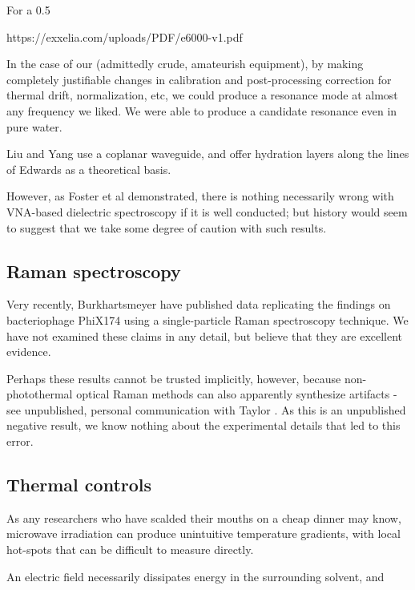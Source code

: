 \documentclass[paper.tex]{subfiles}
\begin{document}
\begin{multicols}{1}

For a 0.5%

https://exxelia.com/uploads/PDF/e6000-v1.pdf


In the case of our (admittedly crude, amateurish equipment), by making completely justifiable changes in calibration and post-processing correction for thermal drift, normalization, etc, we could produce a resonance mode at almost any frequency we liked. We were able to produce a candidate resonance even in pure water.


Liu and Yang use a coplanar waveguide, and offer hydration layers along the lines of Edwards as a theoretical basis.




However, as Foster et al demonstrated, there is nothing necessarily wrong with VNA-based dielectric spectroscopy if it is well conducted; but history would seem to suggest that we take some degree of caution with such results.


\subsection{Raman spectroscopy}

Very recently, Burkhartsmeyer \cite{Optical2020} have published data replicating the findings on bacteriophage PhiX174 using a single-particle Raman spectroscopy technique. We have not examined these claims in any detail, but believe that they are excellent evidence.

Perhaps these results cannot be trusted implicitly, however, because non-photothermal optical Raman methods can also apparently synthesize artifacts - see unpublished, personal communication with Taylor \cite{mechanisms1981}. As this is an unpublished negative result, we know nothing about the experimental details that led to this error.

\subsection{Thermal controls}

As any researchers who have scalded their mouths on a cheap dinner may know, microwave irradiation can produce unintuitive temperature gradients, with local hot-spots that can be difficult to measure directly.

An electric field necessarily dissipates energy in the surrounding solvent, and 


\end{multicols}
\end{document}
